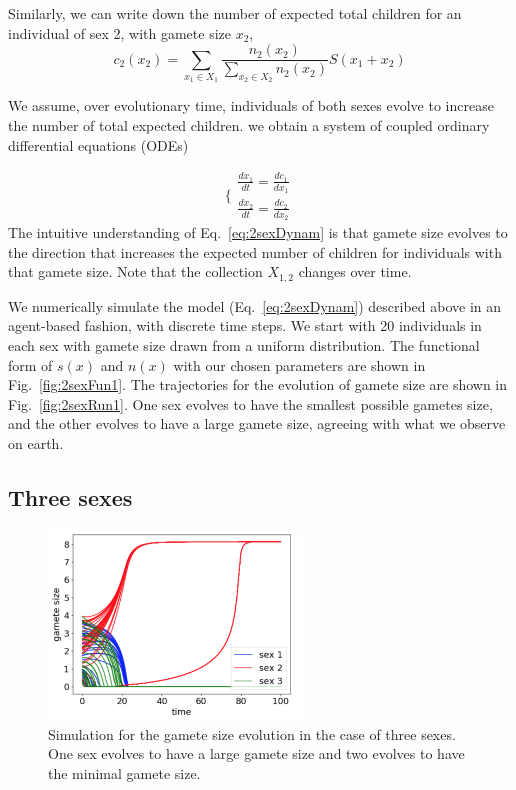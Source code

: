 Similarly, we can write down the number of expected total children for an individual of sex 2, with gamete size $x_2$, 
\begin{equation}
    c_2(x_2) = \sum_{x_1 \in X_1} \frac{n_2(x_2)}{\sum_{x_2\in X_2} n_2(x_2)} S(x_1+ x_2) 
\end{equation}

We assume, over evolutionary time, individuals of both sexes evolve to increase the number of total expected children. we obtain a system of coupled ordinary differential equations (ODEs)

\begin{equation} \label{eq:2sexDynam}
\Bigg\{
\begin{array}{ll}
\frac{dx_1}{dt} = \frac{dc_1}{dx_1} \\
\frac{dx_2}{dt} = \frac{dc_2}{dx_2}  
     \end{array}
\end{equation}
The intuitive understanding of Eq.~\ref{eq:2sexDynam} is that gamete size evolves to the direction that increases the expected number of children for individuals with that gamete size. Note that the collection $X_{1,2}$ changes over time. 

We numerically simulate the model (Eq.~\ref{eq:2sexDynam}) described above in an agent-based fashion, with discrete time steps. We start with 20 individuals in each sex with gamete size drawn from a uniform distribution. The functional form of  $s(x)$ and $n(x)$ with our chosen parameters are shown in Fig.~\ref{fig:2sexFun1}. The trajectories for the evolution of gamete size are shown in Fig.~\ref{fig:2sexRun1}. One sex evolves to have the smallest possible gametes size, and the other evolves to have a large gamete size, agreeing with what we observe on earth. 


\subsection*{Three sexes}


\begin{figure}[htb!]
    \centering
    \includegraphics[width = 0.6\textwidth]{vickysFigs/3_sex_run1}
    \caption{Simulation for the gamete size evolution in the case of three sexes. One sex evolves to have a large gamete size and two evolves to have the minimal gamete size. }
    \label{fig:3sexRun1}
\end{figure}


